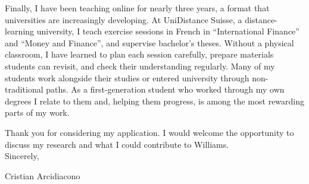 \documentclass[11pt]{article}
\begin{document}
Finally, I have been teaching online for nearly three years, a format that universities are increasingly developing. At UniDistance Suisse, a distance-learning university, I teach exercise sessions in French in ``International Finance'' and ``Money and Finance'', and supervise bachelor's theses. Without a physical classroom, I have learned to plan each session carefully, prepare materials students can revisit, and check their understanding regularly. Many of my students work alongside their studies or entered university through non-traditional paths. As a first-generation student who worked through my own degrees I relate to them and, helping them progress, is among the most rewarding parts of my work. %

Thank you for considering my application. I would welcome the opportunity to discuss my research and what I could contribute to Williams. \\

Sincerely,

Cristian Arcidiacono
\end{document}
